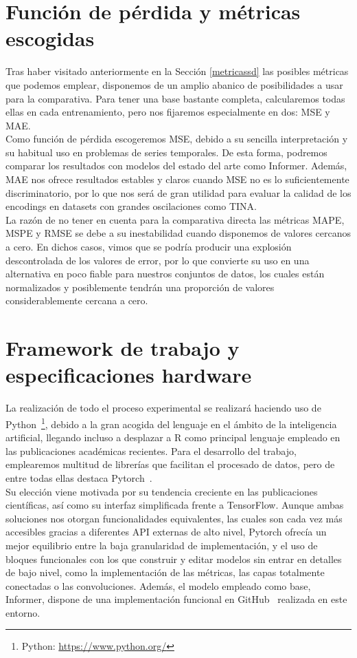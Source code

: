 \section{Función de pérdida y métricas escogidas}

Tras haber visitado anteriormente en la Sección \ref{metricassd} las posibles métricas que podemos emplear, disponemos de un amplio abanico de posibilidades a usar para la comparativa. Para tener una base bastante completa, calcularemos todas ellas en cada entrenamiento, pero nos fijaremos especialmente en dos: MSE y MAE.\\

Como función de pérdida escogeremos MSE, debido a su sencilla interpretación y su habitual uso en problemas de series temporales. De esta forma, podremos comparar los resultados con modelos del estado del arte como Informer. Además, MAE nos ofrece resultados estables y claros cuando MSE no es lo suficientemente discriminatorio, por lo que nos será de gran utilidad para evaluar la calidad de los encodings en datasets con grandes oscilaciones como TINA.\\

La razón de no tener en cuenta para la comparativa directa las métricas MAPE, MSPE y RMSE se debe a su inestabilidad cuando disponemos de valores cercanos a cero. En dichos casos, vimos que se podría producir una explosión descontrolada de los valores de error, por lo que convierte su uso en una alternativa en poco fiable para nuestros conjuntos de datos, los cuales están normalizados y posiblemente tendrán una proporción de valores considerablemente cercana a cero.

\section{Framework de trabajo y especificaciones hardware}

La realización de todo el proceso experimental se realizará haciendo uso de Python~\footnote{Python: \url{https://www.python.org/}}, debido a la gran acogida del lenguaje en el ámbito de la inteligencia artificial, llegando incluso a desplazar a R como principal lenguaje empleado en las publicaciones académicas recientes. Para el desarrollo del trabajo, emplearemos multitud de librerías que facilitan el procesado de datos, pero de entre todas ellas destaca Pytorch~\cite{paszke2019pytorchimperativestylehighperformance}.\\

Su elección viene motivada por su tendencia creciente en las publicaciones científicas, así como su interfaz simplificada frente a TensorFlow. Aunque ambas soluciones nos otorgan funcionalidades equivalentes, las cuales son cada vez más accesibles gracias a diferentes API externas de alto nivel, Pytorch ofrecía un mejor equilibrio entre la baja granularidad de implementación, y el uso de bloques funcionales con los que construir y editar modelos sin entrar en detalles de bajo nivel, como la implementación de las métricas, las capas totalmente conectadas o las convoluciones. Además, el modelo empleado como base, Informer, dispone de una implementación funcional en GitHub~\cite{zhouhaoyi2020informer} realizada en este entorno.\\

